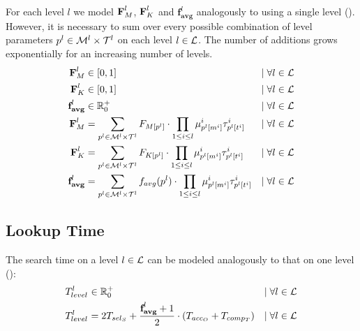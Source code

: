 \documentclass[a4paper,titlepage,onecolumn,oneside,12pt,nenglish,titlepage=firstiscover]{scrbook}
\theoremstyle{plain} %
\theoremstyle{definition} %
\theoremstyle{remark} %
\theoremstyle{plain}
\newcommand{\RR}{\mathbb{R}} %
\newcommand{\minimizerLength}{m}
\newcommand{\threshold}{t}
\newcommand{\level}{l}
\newcommand{\access}{acc}
\newcommand{\select}{sel}
\newcommand{\compare}{comp}
\newcommand{\timeForOperationOnStructure}[2]{T_{#1_{#2}}} %
\newcommand{\varAverageFrequency}{\textbf{f}_{\textbf{avg}}}
\newcommand{\averageFrequency}{f_{avg}}
\newcommand{\possibleMinimizerLengths}{\mathcal{M}}
\newcommand{\possibleThresholds}{\mathcal{T}}
\newcommand{\indicatorm}{\mu}
\newcommand{\indicatort}{\tau}
\begin{document}
For each level $l$ we model $\varCDF{M}^\level$, $\varCDF{K}^\level$ and $\varAverageFrequency^\level$ analogously to using a single level (). However, it is necessary to sum over every possible combination of level parameters $\levelParameters{\level} \in \possibleMinimizerLengths^\level \times \possibleThresholds^\level$ on each level $\level \in \setOfLevels$. The number of additions grows exponentially for an increasing number of levels.
\begin{align} 
	\varCDF{M}^\level &\in [0,1] &\mid \forall l \in \setOfLevels \label{variable:CDFMSEVERALLEVELS}
	\\
	\varCDF{K}^\level &\in [0,1] &\mid \forall l \in \setOfLevels \label{TMP_A}
	\\
	\varAverageFrequency^\level &\in \RR^+_0 &\mid \forall l \in \setOfLevels \label{TMP_B}
	\\
	\varCDF{M}^\level &= \sum\limits_{\levelParameters{\level} \in \possibleMinimizerLengths^\level \times \possibleThresholds^\level}
	\CDF{\compactZV{M}{\levelParameters{\level}}} 
	\cdot
	\prod_{1\leq i \leq \level} \indicatorm^i_{\parameterAccess{\level}{\minimizerLength}{i}} \indicatort^i_{\parameterAccess{\level}{\threshold}{i}}
	& \mid \forall l \in \setOfLevels \label{TMP_C}
	\\
	\varCDF{K}^\level &= \sum\limits_{\levelParameters{\level} \in \possibleMinimizerLengths^\level \times \possibleThresholds^\level}
	\CDF{\compactZV{K}{\levelParameters{\level}}}
	\cdot
	\prod_{1\leq i \leq \level} \indicatorm^i_{\parameterAccess{\level}{\minimizerLength}{i}} \indicatort^i_{\parameterAccess{\level}{\threshold}{i}}
	& \mid \forall l \in \setOfLevels \label{TMP_D}
	\\
	\varAverageFrequency^\level &= \sum\limits_{\levelParameters{\level} \in \possibleMinimizerLengths^\level \times \possibleThresholds^\level}
	\averageFrequency(\levelParameters{\level})
	\cdot
	\prod_{1\leq i \leq \level} \indicatorm^i_{\parameterAccess{\level}{\minimizerLength}{i}} \indicatort^i_{\parameterAccess{\level}{\threshold}{i}}
	& \mid \forall l \in \setOfLevels \label{constraint:FavgSEVERALLEVELS}
\end{align}

\subsection{Lookup Time}
The search time on a level $l \in \mathcal{L}$ can be modeled analogously to that on one level ():
\begin{align}
	\timeForOperationOnStructure{level}{}^\level & \in \RR^+_0 &\mid \forall l \in \setOfLevels\\
	\timeForOperationOnStructure{level}{}^\level &= 2\timeForOperationOnStructure{\select}{S} + \frac{\varAverageFrequency^\level+1}{2}  \cdot (\timeForOperationOnStructure{\access}{O} + \timeForOperationOnStructure{\compare}{T}) &\mid \forall l \in \setOfLevels
\end{align}
\end{document}
